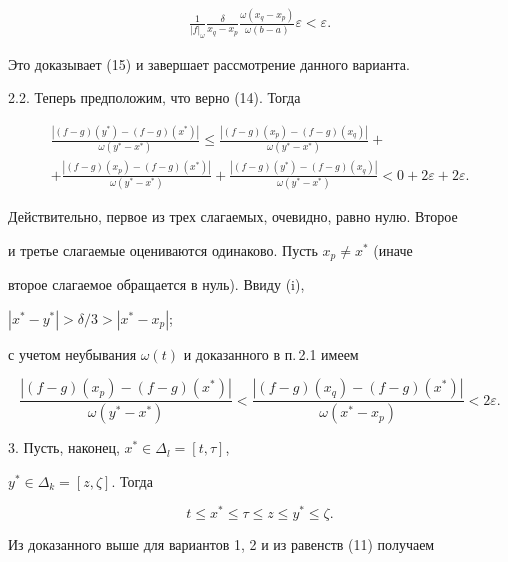 \begin{pf}
\begin{multline*}
\frac{1}{|f|_\omega}\frac{\delta}{x_q-x_p}


\frac{\omega(x_q-x_p)}{\omega(b-a)}\varepsilon<\varepsilon.


\end{multline*}


Это доказывает (15) и завершает рассмотрение данного варианта.





2.2. Теперь предположим, что верно (14). Тогда


\begin{multline*}


\frac{|(f-g)(y^*)-(f-g)(x^*)|}{\omega(y^*-x^*)}\le


\frac{|(f-g)(x_p)-(f-g)(x_q)|}{\omega(y^*-x^*)}+ \\


+\frac{|(f-g)(x_p)-(f-g)(x^*)|}{\omega(y^*-x^*)}+


\frac{|(f-g)(y^*)-(f-g)(x_q)|}{\omega(y^*-x^*)}<0


+2\varepsilon+2\varepsilon.


\end{multline*}


Действительно, первое из трех слагаемых, очевидно, равно нулю. Второе


и третье слагаемые оцениваются одинаково. Пусть $x_p\ne x^*$ (иначе


второе слагаемое обращается в нуль). Ввиду (i),


$|x^*-y^*|>\delta/3>|x^*-x_p|$;


с учетом неубывания $\omega(t)$ и доказанного в п.\,2.1 имеем


$$


\frac{|(f-g)(x_p)-(f-g)(x^*)|}{\omega(y^*-x^*)}<


\frac{|(f-g)(x_q)-(f-g)(x^*)|}{\omega(x^*-x_p)}<2\varepsilon.


$$





3. Пусть, наконец, $x^*\in\Delta_l=[t,\tau]$,


$y^*\in\Delta_k=[z,\zeta]$. Тогда


$$


t\le x^*\le\tau\le z\le y^*\le \zeta.


$$


Из доказанного выше для вариантов 1, 2 и из равенств (11) получаем


\begin{multline*}



\end{multline*}
\end{pf}
